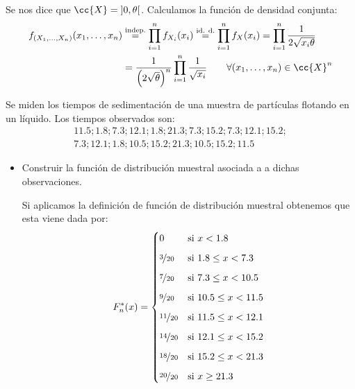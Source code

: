 \begin{ejercicio}
\begin{enumerate}[label=\alph*)]
            Se nos dice que $\cc{X} = \left]0,\theta\right[$. Calculamos la función de densidad conjunta:
            \begin{align*}
                f_{(X_1, \ldots, X_n)}(x_1, \ldots, x_n) &\stackrel{\text{indep.}}{=} \prod_{i=1}^{n} f_{X_i}(x_i) \stackrel{\text{id. d.}}{=} \prod_{i=1}^{n} f_X(x_i) 
                = \prod_{i=1}^{n} \dfrac{1}{2\sqrt{x_i \theta}} \\
                                                         &= \dfrac{1}{{\left(2\sqrt{\theta}\right)}^{n}} \prod_{i=1}^{n} \dfrac{1}{\sqrt{x_i}} \qquad \forall (x_1, \ldots, x_n) \in  \cc{X}^n
            \end{align*}
    \end{enumerate}
\end{ejercicio}

\begin{ejercicio}
    Se miden los tiempos de sedimentación de una muestra de partículas flotando en un líquido. Los tiempos observados son: 
    \begin{gather*}
        11.5; 1.8; 7.3; 12.1; 1.8; 21.3; 7.3; 15.2; 7.3; 12.1; 15.2;\\ 7.3; 12.1; 1.8; 10.5; 15.2; 21.3; 10.5; 15.2; 11.5
    \end{gather*}
    \begin{itemize}
        \item Construir la función de distribución muestral asociada a a dichas observaciones.

            Si aplicamos la definición de función de distribución muestral obtenemos que esta viene dada por:
            \begin{equation*}
                F_n^\ast(x) =
                \begin{cases} 
                0 & \text{si\ } x < 1.8 \\[6pt]
                \nicefrac{3}{20} &\text{si\ } 1.8 \leq x < 7.3 \\[6pt]
                \nicefrac{7}{20} &\text{si\ } 7.3 \leq x < 10.5 \\[6pt]
                \nicefrac{9}{20} &\text{si\ } 10.5 \leq x < 11.5 \\[6pt]
                \nicefrac{11}{20} &\text{si\ } 11.5 \leq x < 12.1 \\[6pt]
                \nicefrac{14}{20} &\text{si\ } 12.1 \leq x < 15.2 \\[6pt]
                \nicefrac{18}{20} &\text{si\ } 15.2 \leq x < 21.3 \\[6pt]
                \nicefrac{20}{20} &\text{si\ } x \geq 21.3
                \end{cases}
            \end{equation*}


\end{itemize}
\end{ejercicio}
